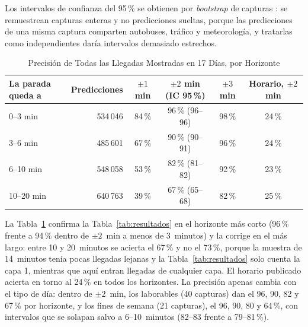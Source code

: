 Los intervalos de confianza del 95\,\% se obtienen por \emph{bootstrap} de capturas \citep{hastie2009}: se remuestrean
capturas enteras y no predicciones sueltas, porque las predicciones de una misma captura comparten autobuses, tráfico y
meteorología, y tratarlas como independientes daría intervalos demasiado estrechos.

\begin{table}[ht]
\centering
\caption{Precisión de Todas las Llegadas Mostradas en 17 Días, por Horizonte}\label{tab:varios-dias}
\begin{tabular}{@{}lrcccc@{}}
\toprule
La parada queda a & Predicciones & $\pm1$ min & $\pm2$ min (IC 95\,\%) & $\pm3$ min & Horario, $\pm2$ min\\
\midrule
0--3 min   & 534\,046 & 84\,\% & 96\,\% (96--96) & 98\,\% & 24\,\%\\
3--6 min   & 485\,601 & 67\,\% & 90\,\% (90--91) & 96\,\% & 24\,\%\\
6--10 min  & 548\,058 & 53\,\% & 82\,\% (81--82) & 92\,\% & 23\,\%\\
10--20 min & 640\,763 & 39\,\% & 67\,\% (65--68) & 82\,\% & 25\,\%\\
\bottomrule
\end{tabular}
\end{table}

La Tabla~\ref{tab:varios-dias} confirma la Tabla~\ref{tab:resultados} en el horizonte más corto (96\,\% frente a 94\,\%
dentro de $\pm2$~min a menos de 3~minutos) y la corrige en el más largo: entre 10 y 20~minutos se acierta el 67\,\% y no el 73\,\%,
porque la muestra de 14~minutos tenía pocas llegadas lejanas y la Tabla~\ref{tab:resultados} solo cuenta la capa 1,
mientras que aquí entran llegadas de cualquier capa. El horario publicado acierta en torno al 24\,\% en todos
los horizontes. La precisión apenas cambia con el tipo de día: dentro de $\pm2$~min, los laborables (40 capturas) dan
el 96, 90, 82 y 67\,\% por horizonte, y los fines de semana (21 capturas), el 96, 90, 80 y 64\,\%, con intervalos que se
solapan salvo a 6--10~minutos (82--83 frente a 79--81\,\%).

